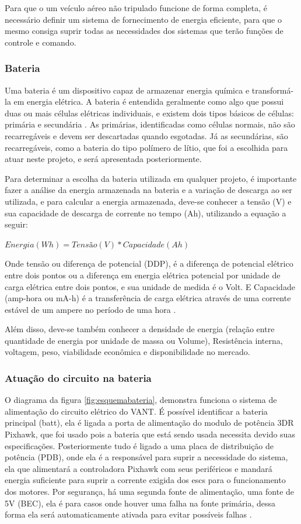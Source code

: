 
Para que o um veículo aéreo não tripulado funcione de forma completa, é necessário definir um sistema de fornecimento de energia eficiente, para que o mesmo consiga suprir todas as necessidades dos sistemas que terão funções de controle e comando.

\subsubsection{Bateria}

Uma bateria é um dispositivo capaz de armazenar energia química e transformá-la em energia elétrica. A bateria é entendida geralmente como algo que possui duas ou mais células elétricas individuais, e existem dois tipos básicos de células: primária e secundária \cite{gibbs}. As primárias, identificadas como células normais, não são recarregáveis e devem ser descartadas quando esgotadas. Já as secundárias, são recarregáveis, como a bateria do tipo polímero de lítio, que foi a escolhida para atuar neste projeto, e será apresentada posteriormente. 

Para determinar a escolha da bateria utilizada em qualquer projeto, é importante fazer a análise  da energia armazenada na bateria e a variação de descarga ao ser utilizada, e para calcular a energia armazenada, deve-se conhecer a tensão (V) e sua capacidade de descarga de corrente no tempo (Ah), utilizando a equação a seguir: \cite{peixoto}

$Energia(Wh)= Tensão(V)*Capacidade(Ah)$

Onde tensão ou diferença de potencial (DDP), é a diferença de potencial elétrico entre dois pontos ou a diferença em energia elétrica potencial por unidade de carga elétrica entre dois pontos, e sua unidade de medida é o Volt. E Capacidade (amp-hora ou mA-h) é a transferência de carga elétrica através de uma corrente estável de um ampere no período de uma hora \cite{gibbs}.

Além disso, deve-se também conhecer a densidade de energia (relação entre quantidade de energia por unidade de massa ou Volume), Resistência interna, voltagem, peso, viabilidade econômica e disponibilidade no mercado.


\subsubsection{Atuação do circuito na bateria}

O diagrama da figura \ref{fig:esquemabateria}, demonstra funciona o sistema de alimentação do circuito elétrico do VANT. É possível identificar a bateria principal (batt), ela é ligada a porta de alimentação do modulo de potência 3DR Pixhawk, que foi usado pois a bateria que está sendo usada necessita devido suas especificações. Posteriormente tudo é ligado a uma placa de distribuição de potência (PDB), onde ela é a responsável para suprir a necessidade do sistema, ela que alimentará a controladora Pixhawk com seus periféricos e mandará energia suficiente para suprir a corrente exigida dos escs para o funcionamento dos motores. Por segurança, há uma segunda fonte de alimentação, uma fonte de 5V (BEC), ela é para casos onde houver uma falha na fonte primária, dessa forma ela será automaticamente ativada para evitar possíveis falhas \cite{pix}.

